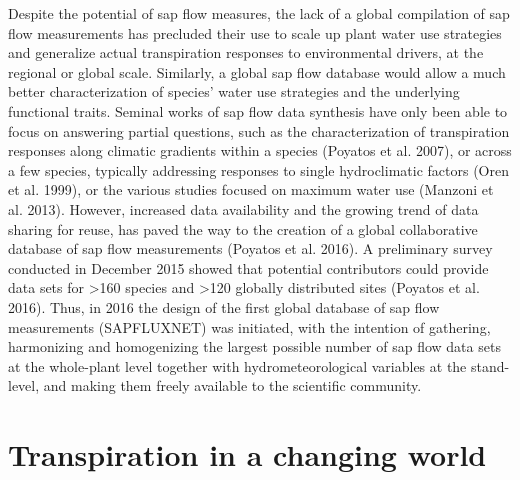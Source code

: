 \documentclass[11pt,twoside]{reedthesis}
\begin{document}
Despite the potential of sap flow measures, the lack of a global
compilation of sap flow measurements has precluded their use to scale up
plant water use strategies and generalize actual transpiration responses
to environmental drivers, at the regional or global scale. Similarly, a
global sap flow database would allow a much better characterization of
species' water use strategies and the underlying functional traits.
Seminal works of sap flow data synthesis have only been able to focus on
answering partial questions, such as the characterization of
transpiration responses along climatic gradients within a species
(Poyatos et al. 2007), or across a few species, typically addressing
responses to single hydroclimatic factors (Oren et al. 1999), or the
various studies focused on maximum water use (Manzoni et al. 2013).
However, increased data availability and the growing trend of data
sharing for reuse, has paved the way to the creation of a global
collaborative database of sap flow measurements (Poyatos et al. 2016). A
preliminary survey conducted in December 2015 showed that potential
contributors could provide data sets for \textgreater{}160 species and
\textgreater{}120 globally distributed sites (Poyatos et al. 2016).
Thus, in 2016 the design of the first global database of sap flow
measurements (SAPFLUXNET) was initiated, with the intention of
gathering, harmonizing and homogenizing the largest possible number of
sap flow data sets at the whole-plant level together with
hydrometeorological variables at the stand-level, and making them freely
available to the scientific community.\par

\section{Transpiration in a changing
world}\label{transpiration-in-a-changing-world}
\end{document}

